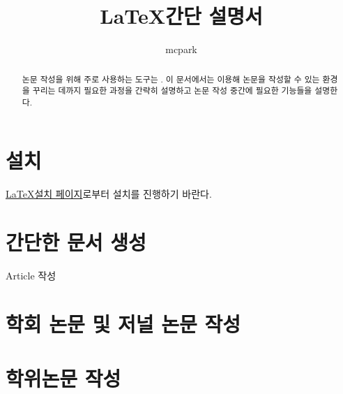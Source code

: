 \documentclass[a4paper, nobookmarks, subfigure, adjustmath, amsmath]{oblivoir}
\title{\LaTeX 간단 설명서}
\author{mcpark}
\begin{document}
\maketitle
\begin{abstract}
논문 작성을 위해 주로 사용하는 도구는 .
이 문서에서는  이용해 논문을 작성할 수 있는 환경을 꾸리는 데까지 필요한 과정을 간략히 설명하고 논문 작성 중간에 필요한  기능들을 설명한다.
\end{abstract}

\section{설치}
\href{http://goo.gl/fDsxQb}{\LaTeX 설치 페이지}로부터 설치를 진행하기 바란다.


\section{간단한 문서 생성}
Article 작성



\section{학회 논문 및 저널 논문 작성}


\section{학위논문 작성}
\end{document}
